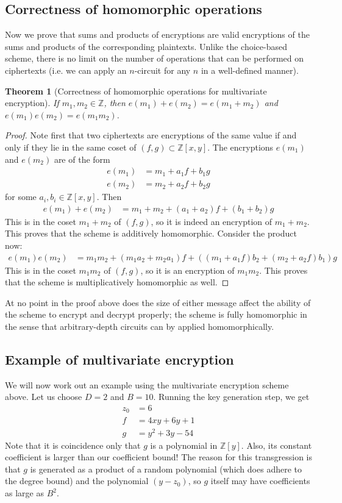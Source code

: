 \documentclass[11pt]{report}
\newtheorem{thm}{Theorem}
\newcommand{\Z}{\mathbb{Z}}
\newcommand{\Zy}{\mathbb{Z}[y]}
\newcommand{\Zxy}{\mathbb{Z}[x,y]}
\begin{document}
\subsection{Correctness of homomorphic operations}

Now we prove that sums and products of encryptions are valid encryptions of the sums and products of the corresponding plaintexts. Unlike the choice-based scheme, there is no limit on the number of operations that can be performed on ciphertexts (i.e. we can apply an $n$-circuit for any $n$ in a well-defined manner).

\begin{thm}[Correctness of homomorphic operations for multivariate encryption] If $m_1,m_2 \in \Z$, then $e(m_1)+e(m_2) = e(m_1+m_2)$ and $e(m_1)e(m_2) = e(m_1m_2)$.
\end{thm}

\begin{proof}
Note first that two ciphertexts are encryptions of the same value if and only if they lie in the same coset of $(f,g)\subset \Zxy$. The encryptions $e(m_1)$ and $e(m_2)$ are of the form
\begin{align*}
e(m_1) &= m_1+a_1f+b_1g\\
e(m_2) &= m_2+a_2f+b_2g
\end{align*}
for some $a_i,b_i\in \Zxy$. Then
\begin{align*}
e(m_1)+e(m_2) &= m_1+m_2 +(a_1+a_2)f+(b_1+b_2)g
\end{align*}
This is in the coset $m_1+m_2$ of $(f,g)$, so it is indeed an encryption of $m_1+m_2$. This proves that the scheme is additively homomorphic. Consider the product now:
\begin{align*}
e(m_1)e(m_2) &= m_1m_2+(m_1a_2+m_2a_1)f+((m_1+a_1f)b_2+(m_2+a_2f)b_1)g
\end{align*}
This is in the coset $m_1m_2$ of $(f,g)$, so it is an encryption of $m_1m_2$. This proves that the scheme is multiplicatively homomorphic as well.
\end{proof}
At no point in the proof above does the size of either message affect the ability of the scheme to encrypt and decrypt properly; the scheme is fully homomorphic in the sense that arbitrary-depth circuits can by applied homomorphically.


\subsection{Example of multivariate encryption}
\label{sec:mv_example}
We will now work out an example using the multivariate encryption scheme above. Let us choose $D=2$ and $B=10$. Running the key generation step, we get
\begin{align*}
z_0 &= 6\\
f &= 4xy+6y+1\\
g &= y^2+3y-54
\end{align*}
Note that it is coincidence only that $g$ is a polynomial in $\Zy$. Also, its constant coefficient is larger than our coefficient bound! The reason for this transgression is that $g$ is generated as a product of a random polynomial (which does adhere to the degree bound) and the polynomial $(y-z_0)$, so $g$ itself may have coefficients as large as $B^2$.
\end{document}
